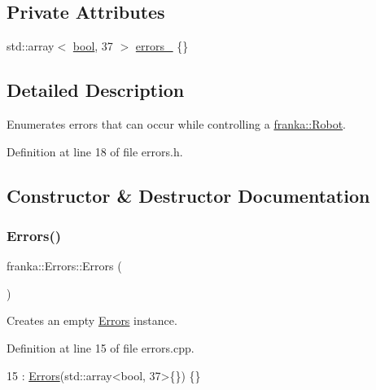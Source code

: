 \subsection*{Private Attributes}
\begin{DoxyCompactItemize}
\item 
std\+::array$<$ \hyperlink{classbool}{bool}, 37 $>$ \hyperlink{structfranka_1_1Errors_ab269bb0ad30eb1aaa7009a246be8e8aa}{errors\+\_\+} \{\}
\end{DoxyCompactItemize}


\subsection{Detailed Description}
Enumerates errors that can occur while controlling a \hyperlink{classfranka_1_1Robot}{franka\+::\+Robot}. 

Definition at line 18 of file errors.\+h.



\subsection{Constructor \& Destructor Documentation}
\mbox{\label{structfranka_1_1Errors_aedd6b6af230c01b6f106b5050b29d9ae}} 
\subsubsection{\texorpdfstring{Errors()}{Errors()}\hspace{0.1cm}{\footnotesize\ttfamily [1/3]}}
{\footnotesize\ttfamily franka\+::\+Errors\+::\+Errors (\begin{DoxyParamCaption}{ }\end{DoxyParamCaption})}

Creates an empty \hyperlink{structfranka_1_1Errors}{Errors} instance. 

Definition at line 15 of file errors.\+cpp.


\begin{DoxyCode}
15 : \hyperlink{structfranka_1_1Errors_aedd6b6af230c01b6f106b5050b29d9ae}{Errors}(std::array<bool, 37>\{\}) \{\}
\end{DoxyCode}
\mbox{\label{structfranka_1_1Errors_a4548a72089cc6d61c9249a1b8f4cc480}} 
